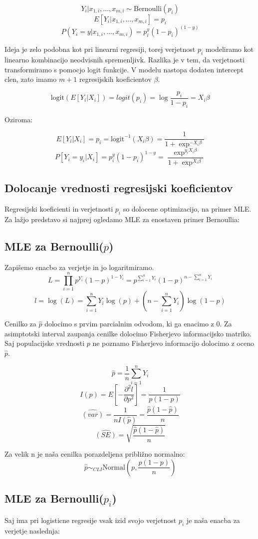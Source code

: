 \documentclass[letterpaper,11pt]{article}
\begin{document}
$$Y_i | x_{1,i},...,x_{m,i}\sim \text{Bernoulli}(p_i)$$
$$E[Y_i | x_{1,i},...,x_{m,i}] = p_i$$
$$P(Y_i = y| x_{1,i},...,x_{m,i}) = p_i^y(1-p_i)^{(1-y)}$$


\noindent Ideja je zelo podobna kot pri linearni regresiji, torej verjetnost $p_i$ modeliramo kot linearno kombinacijo neodvisnih spremenljivk. Razlika je v tem, da verjetnosti transformiramo s pomocjo logit funkcije. V modelu nastopa dodaten intercept clen, zato imamo $m + 1$ regresijskih koeficientov $\beta$.

$$\text{logit}(E[Y_i|X_i]) = logit(p_i) = \log{\frac{p_i}{1-p_i}} = X_i \beta$$

\noindent Oziroma:

$$E[Y_i|X_i] = p_i = \text{logit}^{-1}(X_i \beta) = \frac{1}{1+\exp^{-X_i \beta}}$$
$$P[Y_i = y_i|X_i] = p_i^y(1-p_i)^{1-y} = \frac{\exp^{y_i X_i \beta}}{1+\exp^{X_i \beta}}$$


\subsection{Dolocanje vrednosti regresijski koeficientov}
Regresijski koeficienti in verjetnosti $p_i$ so dolocene optimizacijo, na primer MLE. Za lažjo predstavo si najprej ogledamo MLE za enostaven primer Bernoullia:

\subsection{MLE za Bernoulli($p$)}
Zapišemo enacbo za verjetje in jo logaritmiramo. 
$$L = \prod_{i=1}^n p^{Y_i}(1-p)^{1-Y_i}=p^{\sum_{i=1}^n Y_i}(1-p)^{n-\sum_{i=1}^n Y_i}$$
$$l = \log{(L)} = \sum_{i=1}^n Y_i \log{(p)} + (n-\sum_{i=1}^n Y_i)\log{(1-p)}$$

\noindent Cenilko za $\hat{p}$ dolocimo s prvim parcialnim odvodom, ki ga enacimo z 0. Za asimptotski interval zaupanja cenilke dolocimo Fisherjevo informacijsko matriko. Saj populacijske vrednosti $p$ ne poznamo Fisherjevo informacijo dolocimo z oceno $\hat{p}$.

$$\hat{p}=\frac{1}{n}\sum_{i = 1}^n Y_i$$
$$I(p) = E[-\frac{\partial^2 l}{\partial p^2}]= \frac{1}{p(1-p)}$$
$$\hat{(var)} = \frac{1}{nI(\hat{p})} = \frac{\hat{p}(1-\hat{p})}{n}$$
$$\hat{(SE)} = \sqrt{\frac{\hat{p}(1-\hat{p})}{n}}$$

\noindent Za velik n je naša cenilka porazdeljena približno normalno:
$$\hat{p} \sim_{CLI} \text{Normal}(p, \frac{p(1-p)}{n})$$


\subsection{MLE za Bernoulli($p_i$)}
Saj ima pri logisticne regresije vsak izid svojo verjetnost $p_i$ je naša enacba za verjetje naslednja:
\end{document}
